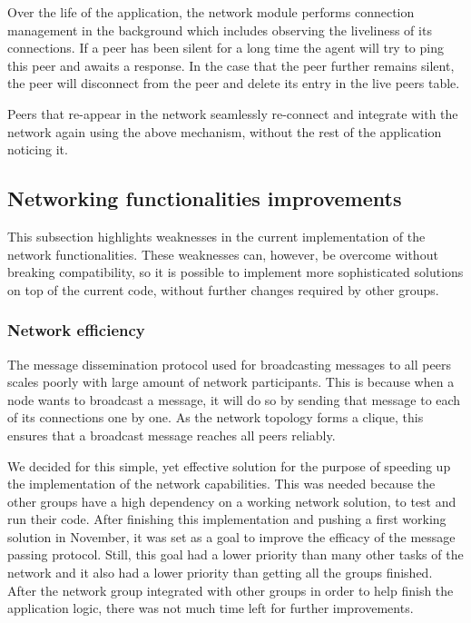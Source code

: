 Over the life of the application, the network module performs connection management in the background which includes observing the liveliness of its connections. If a peer has been silent for a long time the agent will try to ping this peer and awaits a response. In the case that the peer further remains silent, the peer will disconnect from the peer and delete its entry in the live peers table. 

Peers that re-appear in the network seamlessly re-connect and integrate with the network again using the above mechanism, without the rest of the application noticing it. 

\subsection{Networking functionalities improvements}

This subsection highlights weaknesses in the current implementation of the network functionalities. 
These weaknesses can, however, be overcome without breaking compatibility, so it is possible to implement more sophisticated solutions on top of the current code, without further changes required by other groups. 

\subsubsection{Network efficiency}

The message dissemination protocol used for broadcasting messages to all peers scales poorly with large amount of network participants. 
This is because when a node wants to broadcast a message, it will do so by sending that message to each of its connections one by one. As the network topology forms a clique, this ensures that a broadcast message reaches all peers reliably. 

We decided for this simple, yet effective solution for the purpose of speeding up the implementation of the network capabilities. This was needed because the other groups have a high dependency on a working network solution, to test and run their code. 
After finishing this implementation and pushing a first working solution in November, it was set as a goal to improve the efficacy of the message passing protocol.
Still, this goal had a lower priority than many other tasks of the network and it also had a lower priority than getting all the groups finished. After the network group integrated with other groups in order to help finish the application logic, there was not much time left for further improvements.

